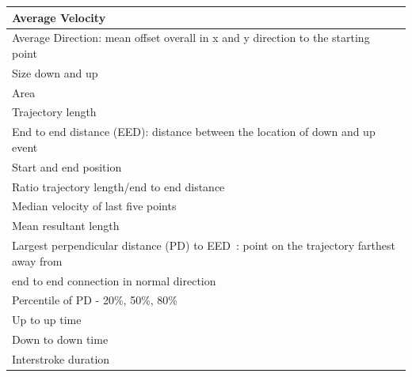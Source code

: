 \documentclass{llncs}
\begin{document}
\begin{table}
{\begin{tabularx}{\textwidth}{|X|}
  	Average Velocity                                                                                                        \\ \hline
  	Average Direction: mean offset overall in x and y direction to the starting point~\cite{velten2015user}                 \\ \hline
  	Size down and up                                                                                                        \\ \hline
  	Area                                                                                                                    \\ \hline
  	Trajectory length~\cite{Frank13}                                                                                        \\ \hline
  	End to end distance (EED): distance between the location of down and up event~\cite{Frank13}                            \\ \hline
  	Start and end position                                                                                                  \\ \hline
  	Ratio trajectory length/end to end distance                                                                             \\ \hline
  	Median velocity of last five points~\cite{Frank13}                                                                      \\ \hline
  	Mean resultant length~\cite{Frank13}                                                                                    \\ \hline
  	Largest perpendicular distance (PD) to EED~\cite{Frank13}: point on the trajectory farthest away  from                  \\
  	end to end  connection in normal direction                                                                              \\ \hline
  	Percentile of PD - 20\%, 50\%, 80\%                                                                                     \\ \hline
  	Up to up time~\cite{Frank13,buschek2015}                                                                                \\ \hline
  	Down to down time~\cite{Frank13,buschek2015}                                                                            \\ \hline
  	Interstroke duration                                                                                                    \\ \hline

\end{tabularx}}
\end{table}
\end{document}

